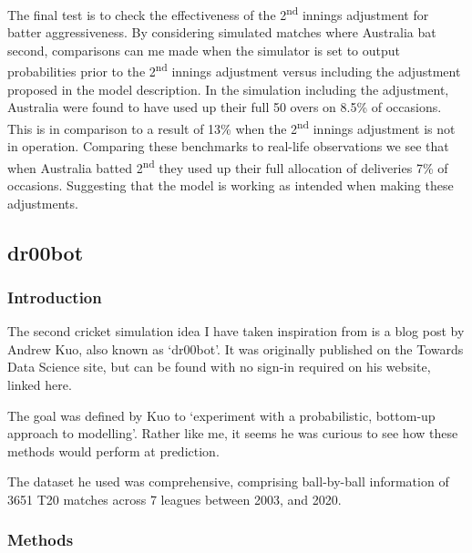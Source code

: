 The final test is to check the effectiveness of the 2\textsuperscript{nd} innings adjustment for batter aggressiveness. By considering simulated matches where Australia bat second, comparisons can me made when the simulator is set to output probabilities prior to the 2\textsuperscript{nd} innings adjustment versus including the adjustment proposed in the model description. In the simulation including the adjustment, Australia were found to have used up their full 50 overs on 8.5\% of occasions. This is in comparison to a result of 13\% when the 2\textsuperscript{nd} innings adjustment is not in operation. Comparing these benchmarks to real-life observations we see that when Australia batted 2\textsuperscript{nd} they used up their full allocation of deliveries 7\% of occasions. Suggesting that the model is working as intended when making these adjustments.

\subsection{dr00bot}

\subsubsection{Introduction}

The second cricket simulation idea I have taken inspiration from is a blog post by Andrew Kuo, also known as ‘dr00bot’. It was originally published on the Towards Data Science site, but can be found with no sign-in required on his website, linked here. \cite{kuo_predicting_2021}

The goal was defined by Kuo to ‘experiment with a probabilistic, bottom-up approach to modelling’. Rather like me, it seems he was curious to see how these methods would perform at prediction.

The dataset he used was comprehensive, comprising ball-by-ball information of 3651 T20 matches across 7 leagues between 2003, and 2020.

\subsubsection{Methods}

